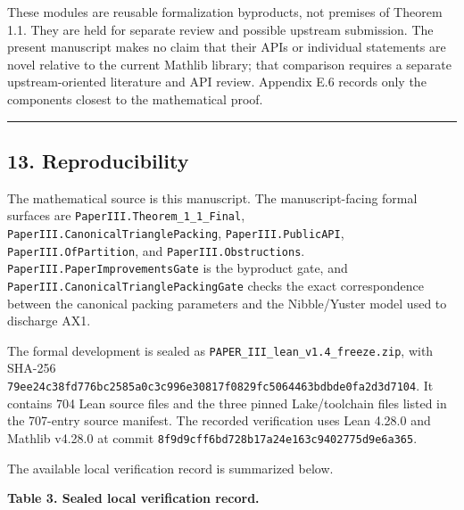 \documentclass[english,11pt,a4paper]{article}
\begin{document}
These modules are reusable formalization byproducts, not premises of
Theorem 1.1. They are held for separate review and possible upstream
submission. The present manuscript makes no claim that their APIs or
individual statements are novel relative to the current Mathlib library;
that comparison requires a separate upstream-oriented literature and API
review. Appendix E.6 records only the components closest to the
mathematical proof.

\begin{center}\rule{0.5\linewidth}{0.5pt}\end{center}

\subsection{13. Reproducibility}\label{reproducibility}

The mathematical source is this manuscript. The manuscript-facing formal
surfaces are \nolinkurl{PaperIII.Theorem_1_1_Final},
\nolinkurl{PaperIII.CanonicalTrianglePacking}, \nolinkurl{PaperIII.PublicAPI},
\nolinkurl{PaperIII.OfPartition}, and \nolinkurl{PaperIII.Obstructions}.
\nolinkurl{PaperIII.PaperImprovementsGate} is the byproduct gate, and
\nolinkurl{PaperIII.CanonicalTrianglePackingGate} checks the exact
correspondence between the canonical packing parameters and the
Nibble/Yuster model used to discharge AX1.

The formal development is sealed as
\nolinkurl{PAPER_III_lean_v1.4_freeze.zip}, with SHA-256
\nolinkurl{79ee24c38fd776bc2585a0c3c996e30817f0829fc5064463bdbde0fa2d3d7104}.
It contains 704 Lean source files and the three pinned Lake/toolchain
files listed in the 707-entry source manifest. The recorded verification
uses Lean 4.28.0 and Mathlib v4.28.0 at commit
\nolinkurl{8f9d9cff6bd728b17a24e163c9402775d9e6a365}.

The available local verification record is summarized below.

\textbf{Table 3. Sealed local verification record.}
\end{document}
